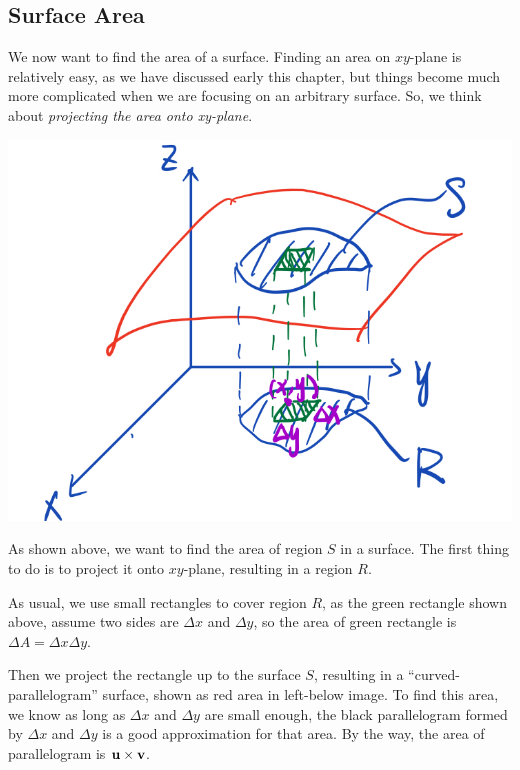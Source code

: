 \documentclass[11pt, a4paper]{MATH2023}
\begin{document}
\begin{spacing}{1.3}
    \newpage
    \section{Surface Area}
    
    We now want to find the area of a surface. Finding an area on $xy$-plane is relatively easy, as we 
    have discussed early this chapter, but things become much more complicated when we are focusing
    on an arbitrary surface. So, we think about {\it projecting the area onto xy-plane}.

    \begin{center}
        \includegraphics[scale=0.25]{images/Ch14-surface-area.jpeg}
    \end{center}

    As shown above, we want to find the area of region $S$ in a surface. The first thing to do 
    is to project it onto $xy$-plane, resulting in a region $R$.

    As usual, we use small rectangles to cover region $R$, as the green rectangle shown above,
    assume two sides are $\Delta x$ and $\Delta y$, so the area of green rectangle is $\Delta A
    =\Delta x\Delta y$.

    Then we project the rectangle up to the surface $S$, resulting in a ``curved-parallelogram''
    surface, shown as red area in left-below image. To find this area, we know as long as 
    $\Delta x$ and $\Delta y$ are small enough, the black parallelogram formed by $\Delta x$ and $\Delta y$
    is a good approximation for that area. By the way, the area of parallelogram is ${\bf u}\times {\bf v}$.


\end{spacing}
\end{document}
